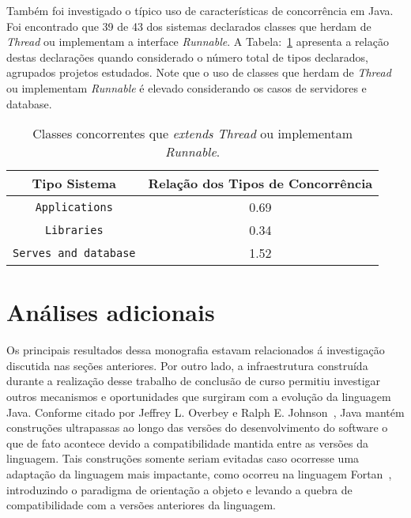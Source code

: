Também foi investigado o típico uso de características de concorrência em Java. Foi encontrado que 39 de 43 dos sistemas declarados classes que herdam de \textit{Thread} ou implementam a interface \textit{Runnable}. A Tabela:~\ref{tab:concorrenciaJava} apresenta a relação destas declarações quando considerado o número total de tipos declarados, agrupados projetos estudados. Note que o uso de classes que herdam de \textit{Thread} ou implementam \textit{Runnable} é elevado considerando os casos de servidores e database.

\begin{table}[h]
	\centering
	\caption{Classes concorrentes que \textit{extends Thread} ou implementam \textit{Runnable}.}
	\begin{tabular}{cc}
		\hline
		Tipo Sistema & Relação dos Tipos de Concorrência\\ 
		\hline \hline
		\texttt{Applications} & 0.69 \\ 
		\texttt{Libraries} & 0.34 \\ 
		\texttt{Serves and database} & 1.52 \\ \hline
	\end{tabular}
	\label{tab:concorrenciaJava} %
\end{table}

\section{An\'{a}lises adicionais}

Os principais resultados dessa monografia estavam relacionados \'{a} investiga\c c\~{a}o 
discutida nas se\c c\~{o}es anteriores. Por outro lado, a infraestrutura constru\'{i}da 
durante a realiza\c c\~{a}o desse trabalho de conclus\~{a}o de curso permitiu 
investigar outros mecanismos e oportunidades que surgiram com a evolu\c c\~{a}o 
da linguagem Java. Conforme citado por Jeffrey L. Overbey e Ralph E. Johnson~\cite{Overbey:2009}, 
Java mantém construções ultrapassas ao longo das versões do desenvolvimento do software o que 
de fato acontece devido a compatibilidade mantida entre as versões da linguagem. Tais construções somente 
seriam evitadas caso ocorresse uma adapta\c c\~{a}o da linguagem mais impactante, como ocorreu na linguagem Fortan~\cite{Overbey:2009}, 
introduzindo o paradigma de orientação a objeto e levando a quebra de compatibilidade com a versões anteriores da linguagem.

%

